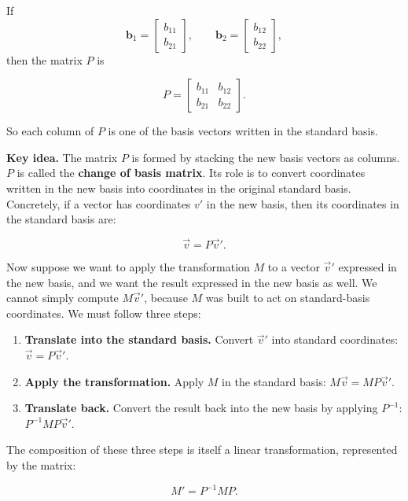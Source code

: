 \documentclass[11pt,openany]{book}
\theoremstyle{definition}
\begin{document}
\medskip

If
\[
\mathbf{b}_1 = \begin{bmatrix} b_{11} \\ b_{21} \end{bmatrix}, 
\qquad
\mathbf{b}_2 = \begin{bmatrix} b_{12} \\ b_{22} \end{bmatrix},
\]
then the matrix $P$ is

\[
P =
\begin{bmatrix}
b_{11} & b_{12} \\
b_{21} & b_{22}
\end{bmatrix}.
\]

\medskip

So each column of $P$ is one of the basis vectors written in the standard basis.

\medskip

\textbf{Key idea.} The matrix $P$ is formed by stacking the new basis vectors as columns.
$P$ is called the \textbf{change of basis matrix}. Its role is to convert coordinates 
written in the new basis into coordinates in the original standard basis. Concretely, 
if a vector has coordinates $v'$ in the new basis, then its coordinates in the 
standard basis are:

\[
\vec{v} = P\vec{v}'.
\]

Now suppose we want to apply the transformation $M$ to a vector $\vec{v}'$ expressed 
in the new basis, and we want the result expressed in the new basis as well. 
We cannot simply compute $M\vec{v}'$, because $M$ was built to act on standard-basis 
coordinates. We must follow three steps:

\begin{enumerate}
  \item \textbf{Translate into the standard basis.} Convert $\vec{v}'$ into standard 
  coordinates: $\vec{v} = P\vec{v}'$.
  \item \textbf{Apply the transformation.} Apply $M$ in the standard basis: 
  $M\vec{v} = MP\vec{v}'$.
  \item \textbf{Translate back.} Convert the result back into the new basis by 
  applying $P^{-1}$: $P^{-1}MP\vec{v}'$.
\end{enumerate}

\medskip

The composition of these three steps is itself a linear transformation, represented by 
the matrix:

\[
M' = P^{-1}MP.
\]
\end{document}
